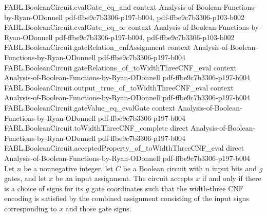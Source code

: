 \begin{theorem}
\proofstep
  {FABL.BooleanCircuit.evalGate_eq_and}
  {context}
  {Analysis-of-Boolean-Functions-by-Ryan-ODonnell}
  {pdf-ffbe9c7b3306-p197-b004,
    pdf-ffbe9c7b3306-p103-b002}
\proofstep
  {FABL.BooleanCircuit.evalGate_eq_or}
  {context}
  {Analysis-of-Boolean-Functions-by-Ryan-ODonnell}
  {pdf-ffbe9c7b3306-p197-b004,
    pdf-ffbe9c7b3306-p103-b002}
\proofstep
  {FABL.BooleanCircuit.gateRelation_cnfAssignment}
  {context}
  {Analysis-of-Boolean-Functions-by-Ryan-ODonnell}
  {pdf-ffbe9c7b3306-p197-b004}
\proofstep
  {FABL.BooleanCircuit.gateRelations_of_toWidthThreeCNF_eval}
  {context}
  {Analysis-of-Boolean-Functions-by-Ryan-ODonnell}
  {pdf-ffbe9c7b3306-p197-b004}
\proofstep
  {FABL.BooleanCircuit.output_true_of_toWidthThreeCNF_eval}
  {context}
  {Analysis-of-Boolean-Functions-by-Ryan-ODonnell}
  {pdf-ffbe9c7b3306-p197-b004}
\proofstep
  {FABL.BooleanCircuit.gateValue_eq_evalGate}
  {context}
  {Analysis-of-Boolean-Functions-by-Ryan-ODonnell}
  {pdf-ffbe9c7b3306-p197-b004}
\proofstep
  {FABL.BooleanCircuit.toWidthThreeCNF_complete}
  {direct}
  {Analysis-of-Boolean-Functions-by-Ryan-ODonnell}
  {pdf-ffbe9c7b3306-p197-b004}
\proofstep
  {FABL.BooleanCircuit.acceptedProperty_of_toWidthThreeCNF_eval}
  {direct}
  {Analysis-of-Boolean-Functions-by-Ryan-ODonnell}
  {pdf-ffbe9c7b3306-p197-b004}
Let $n$ be a nonnegative integer, let $C$ be a Boolean circuit with $n$ input bits and
$g$ gates, and let $x$ be an input assignment. The circuit accepts $x$ if and only if
there is a choice of signs for its $g$ gate coordinates such that the width-three CNF
encoding is satisfied by the combined assignment consisting of the input signs
corresponding to $x$ and those gate signs.
\end{theorem}

